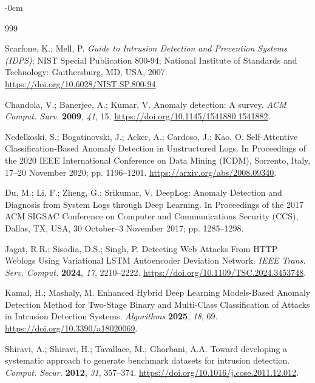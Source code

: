 \documentclass[futureinternet,article,accept,moreauthors]{Definitions/mdpi}
\begin{document}
\begin{adjustwidth}{-\extralength}{0cm}
\begin{thebibliography}{999}

Scarfone, K.; Mell, P. \emph{Guide to Intrusion Detection and Prevention Systems (IDPS)}; NIST Special Publication 800-94; National Institute of Standards and Technology: Gaithersburg, MD, USA, 2007. \url{https://doi.org/10.6028/NIST.SP.800-94}.

Chandola, V.; Banerjee, A.; Kumar, V. Anomaly detection: A survey. \emph{ACM Comput. Surv.} \textbf{2009}, \emph{41}, 15. \url{https://doi.org/10.1145/1541880.1541882}.

Nedelkoski, S.; Bogatinovski, J.; Acker, A.; Cardoso, J.; Kao, O. Self-Attentive Classification-Based Anomaly Detection in Unstructured Logs. In Proceedings of the 2020 IEEE International Conference on Data Mining (ICDM), Sorrento, Italy, 17--20 November 2020; pp. 1196--1201. \url{https://arxiv.org/abs/2008.09340}.

Du, M.; Li, F.; Zheng, G.; Srikumar, V. DeepLog: Anomaly Detection and Diagnosis from System Logs through Deep Learning. In Proceedings of the 2017 ACM SIGSAC Conference on Computer and Communications Security (CCS), Dallas, TX, USA, 30 October--3 November 2017; pp. 1285--1298.

Jagat, R.R.; Sisodia, D.S.; Singh, P. Detecting Web Attacks From HTTP Weblogs Using Variational LSTM Autoencoder Deviation Network. \emph{IEEE Trans. Serv. Comput.} \textbf{2024}, \emph{17}, 2210--2222. \url{https://doi.org/10.1109/TSC.2024.3453748}.

Kamal, H.; Mashaly, M. Enhanced Hybrid Deep Learning Models-Based Anomaly Detection Method for Two-Stage Binary and Multi-Class Classification of Attacks in Intrusion Detection Systems. \emph{Algorithms} \textbf{2025}, \emph{18}, 69. \url{https://doi.org/10.3390/a18020069}.

Shiravi, A.; Shiravi, H.; Tavallaee, M.; Ghorbani, A.A. Toward developing a systematic approach to generate benchmark datasets for intrusion detection. \emph{Comput. Secur.} \textbf{2012}, \emph{31}, 357--374. \url{https://doi.org/10.1016/j.cose.2011.12.012}.


\end{thebibliography}
\end{adjustwidth}
\end{document}
